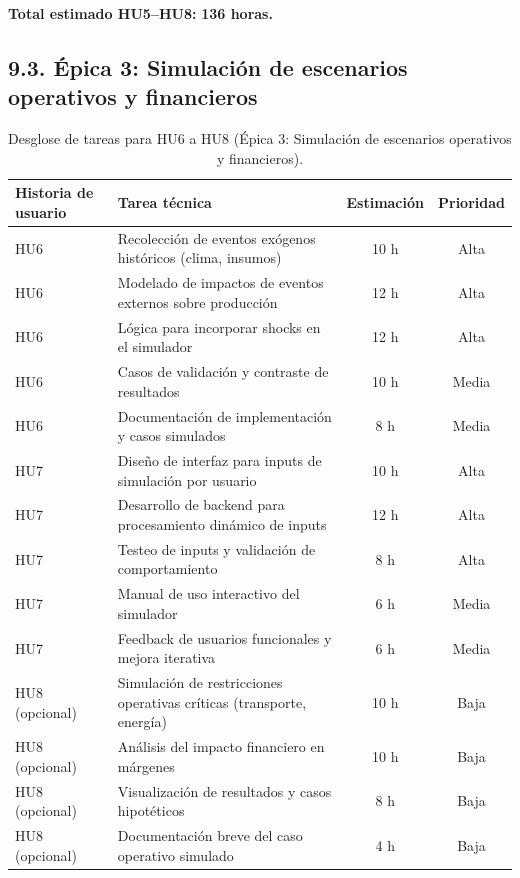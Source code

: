 \documentclass[
11pt, %
]{charter}
\begin{document}
\vspace{0.5cm}
\noindent
\textbf{Total estimado HU5–HU8:} \textbf{136 horas.}

\subsection*{9.3. Épica 3: Simulación de escenarios operativos y financieros}

\begin{table}[H]
\centering
\begin{tabular}{|l|p{6cm}|c|c|}
\hline
\textbf{Historia de usuario} & \textbf{Tarea técnica} & \textbf{Estimación} & \textbf{Prioridad} \\
\hline
HU6 & Recolección de eventos exógenos históricos (clima, insumos) & 10 h & Alta \\
HU6 & Modelado de impactos de eventos externos sobre producción & 12 h & Alta \\
HU6 & Lógica para incorporar shocks en el simulador & 12 h & Alta \\
HU6 & Casos de validación y contraste de resultados & 10 h & Media \\
HU6 & Documentación de implementación y casos simulados & 8 h & Media \\
\hline
HU7 & Diseño de interfaz para inputs de simulación por usuario & 10 h & Alta \\
HU7 & Desarrollo de backend para procesamiento dinámico de inputs & 12 h & Alta \\
HU7 & Testeo de inputs y validación de comportamiento & 8 h & Alta \\
HU7 & Manual de uso interactivo del simulador & 6 h & Media \\
HU7 & Feedback de usuarios funcionales y mejora iterativa & 6 h & Media \\
\hline
HU8 (opcional) & Simulación de restricciones operativas críticas (transporte, energía) & 10 h & Baja \\
HU8 (opcional) & Análisis del impacto financiero en márgenes & 10 h & Baja \\
HU8 (opcional) & Visualización de resultados y casos hipotéticos & 8 h & Baja \\
HU8 (opcional) & Documentación breve del caso operativo simulado & 4 h & Baja \\
\hline
\end{tabular}
\caption{Desglose de tareas para HU6 a HU8 (Épica 3: Simulación de escenarios operativos y financieros).}
\end{table}
\end{document}
